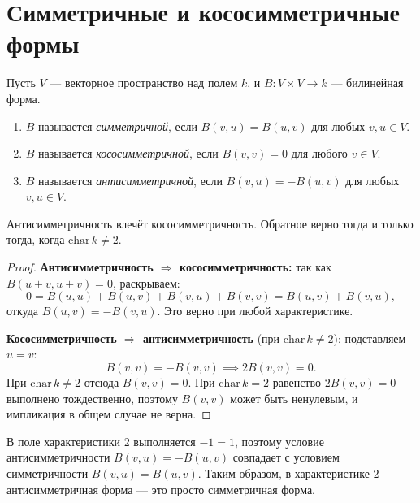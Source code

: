 \section{Симметричные и кососимметричные формы}

\begin{definition}
    Пусть $V$ --- векторное пространство над полем $k$, и $B\colon V \times V \to k$ --- билинейная форма.

    \begin{enumerate}
        \item $B$ называется \emph{симметричной}, если $B(v, u) = B(u, v)$ для любых $v, u \in V$.
        \item $B$ называется \emph{кососимметричной}, если $B(v, v) = 0$ для любого $v \in V$.
        \item $B$ называется \emph{антисимметричной}, если $B(v, u) = -B(u, v)$ для любых $v, u \in V$.
    \end{enumerate}
\end{definition}


\begin{stmt}
    Антисимметричность влечёт кососимметричность. Обратное верно тогда и только тогда,
    когда $\mathrm{char}\, k \neq 2$.
    \begin{proof}
        \textbf{Антисимметричность $\Rightarrow$ кососимметричность:}
        так как $B(u+v, u+v) = 0$, раскрываем:
        \[
            0 = B(u,u) + B(u,v) + B(v,u) + B(v,v) = B(u,v) + B(v,u),
        \]
        откуда $B(u,v) = -B(v,u)$. Это верно при любой характеристике.

        \textbf{Кососимметричность $\Rightarrow$ антисимметричность} (при $\mathrm{char}\, k \neq 2$):
        подставляем $u = v$:
        \[
            B(v,v) = -B(v,v) \implies 2B(v,v) = 0.
        \]
        При $\mathrm{char}\, k \neq 2$ отсюда $B(v,v) = 0$.
        При $\mathrm{char}\, k = 2$ равенство $2B(v,v) = 0$ выполнено тождественно,
        поэтому $B(v,v)$ может быть ненулевым, и импликация в общем случае не верна.
    \end{proof}
\end{stmt}


\begin{remark}
    В поле характеристики $2$ выполняется $-1 = 1$, поэтому условие антисимметричности $B(v, u) = -B(u, v)$ совпадает с условием симметричности $B(v, u) = B(u, v)$. Таким образом, в характеристике $2$ антисимметричная форма --- это просто симметричная форма.
\end{remark}


